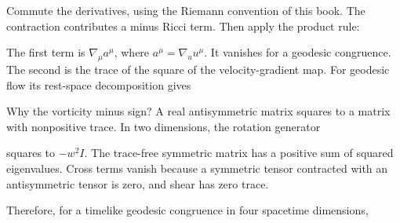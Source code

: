 \documentclass[
  11pt,
  letterpaper,
  oneside,
  openany]{scrbook}
\begin{document}
Commute the derivatives, using the Riemann convention of this book. The
contraction contributes a minus Ricci term. Then apply the product rule:

\begin{center}
\begingroup
{}
\ifdim\wd\grmathbox>\linewidth
\resizebox{\linewidth}{!}{\usebox{\grmathbox}}
\else\usebox{\grmathbox}\fi
\endgroup
\end{center}

The first term is \(\nabla_\mu a^\mu\), where \(a^\mu=\nabla_u u^\mu\).
It vanishes for a geodesic congruence. The second is the trace of the
square of the velocity-gradient map. For geodesic flow its rest-space
decomposition gives

\begin{center}
\begingroup
{}
\ifdim\wd\grmathbox>\linewidth
\resizebox{\linewidth}{!}{\usebox{\grmathbox}}
\else\usebox{\grmathbox}\fi
\endgroup
\end{center}

Why the vorticity minus sign? A real antisymmetric matrix squares to a
matrix with nonpositive trace. In two dimensions, the rotation generator

\begin{center}
\begingroup
{}
\ifdim\wd\grmathbox>\linewidth
\resizebox{\linewidth}{!}{\usebox{\grmathbox}}
\else\usebox{\grmathbox}\fi
\endgroup
\end{center}

squares to \(-w^2I\). The trace-free symmetric matrix has a positive sum
of squared eigenvalues. Cross terms vanish because a symmetric tensor
contracted with an antisymmetric tensor is zero, and shear has zero
trace.

Therefore, for a timelike geodesic congruence in four spacetime
dimensions,

\begin{center}
\begingroup
{}
\ifdim\wd\grmathbox>\linewidth
\resizebox{\linewidth}{!}{\usebox{\grmathbox}}
\else\usebox{\grmathbox}\fi
\endgroup
\end{center}
\end{document}
